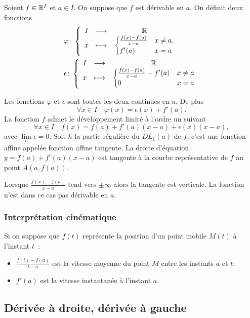 Soient \(f \in \mathbb{R}^I\) et \(a \in I\). On suppose que \(f\) est dérivable en
\(a\). On définit deux fonctions
\begin{align*}
  &\varphi\colon\left\{\begin{array}{ccc}I & \longrightarrow &\mathbb{R}\\x & \longmapsto & \begin{cases}\frac{f(x)-f(a)}{x-a} & x \neq a,
    \\ f'(a) & x=a\end{cases}\end{array}\right. \\
    &\epsilon\colon\left\{\begin{array}{ccc}I & \longrightarrow &\mathbb{R}\\x & \longmapsto & \begin{cases}\frac{f(x)-f(a)}{x-a} -f'(a)& x
    \neq a \\ 0 & x=a\end{cases}\end{array}\right.
\end{align*}
%
\begin{prop}
  Les fonctions \(\varphi\) et \(\epsilon\) sont toutes les deux continues en
  \(a\). De plus
  \begin{equation}
    \forall x \in I \quad \varphi(x) = \epsilon(x) +f'(a).
  \end{equation}
  La fonction \(f\) admet le développement limité à l'ordre un suivant
  \begin{equation}
    \forall x \in I \quad f(x) = f(a) + f'(a)(x-a) + \epsilon(x)(x-a),
  \end{equation}
  avec \(\lim\limits_{a} \epsilon=0\). Soit \(h\) la partie régulière du
  \(DL_1(a)\) de \(f\), c'est une fonction affine appelée fonction affine
  tangente. La droite d'équation \(y=f(a)+f'(a)(x-a)\) est tangente à la courbe
  représentative de \(f\) au point \(A(a,f(a))\).
\end{prop}
%
Lorsque \(\frac{f(x)-f(a)}{x-a}\) tend vers \(\pm\infty\) alors la tangente est
verticale. La fonction n'est dans ce cas pas dérivable en \(a\).

\subsubsection{Interprétation cinématique}
Si on suppose que \(f(t)\) représente la position d'un point mobile \(M(t)\) à
l'instant \(t\)~:
\begin{itemize}
  \item \(\frac{f(t)-f(a)}{t-a}\) est la vitesse moyenne du point \(M\) entre
    les instants \(a\) et \(t\);
  \item \(f'(a)\) est la vitesse instantanée à l'instant \(a\).
\end{itemize}

\subsection{Dérivée à droite, dérivée à gauche}

